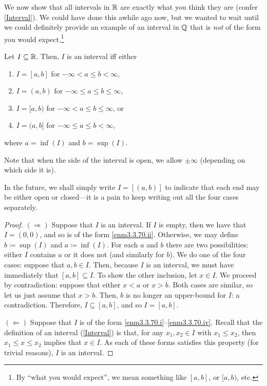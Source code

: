 We now show that all intervals in $\mathbb{R}$ are exactly what you think they are (confer \cref{Interval}).  We could have done this awhile ago now, but we wanted to wait until we could definitely provide an example of an interval in $\mathbb{Q}$ that is \emph{not} of the form you would expect.\footnote{By ``what you would expect'', we mean something like $[a,b]$, or $[a,b)$, etc.}
\begin{prp}\label{prp3.3.70}
Let $I\subseteq \mathbb{R}$.  Then, $I$ is an interval iff either
\begin{enumerate}
\item \label{enm3.3.70.i}$I=[a,b]$ for $-\infty <a\leq b<\infty $,
\item \label{enm3.3.70.ii}$I=(a,b)$ for $-\infty \leq a\leq b\leq \infty$,
\item \label{enm3.3.70.iii}$I=[a,b)$ for $-\infty <a\leq b\leq \infty$, or
\item \label{enm3.3.70.iv}$I=(a,b]$ for $-\infty \leq a\leq b<\infty$,
\end{enumerate}
where $a=\inf (I)$ and $b=\sup (I)$.
\begin{rmk}
Note that when the side of the interval is open, we allow $\pm \infty$ (depending on which side it is).
\end{rmk}
\begin{rmk}
In the future, we shall simply write $I=[(a,b)]$\index[notation]{$[(a,b)]$} to indicate that each end may be either open or closed---it is a pain to keep writing out all the four cases separately.
\end{rmk}
\begin{proof}
$(\Rightarrow )$ Suppose that $I$ is an interval.  If $I$ is empty, then we have that $I=(0,0)$, and so is of the form \ref{enm3.3.70.ii}.  Otherwise, we may define $b\coloneqq \sup (I)$ and $a\coloneqq \inf (I)$.  For each $a$ and $b$ there are two possibilities: either $I$ contains $a$ or it does not (and similarly for $b$).  We do one of the four cases:  suppose that $a,b\in I$.  Then, because $I$ is an interval, we must have immediately that $[a,b]\subseteq I$.  To show the other inclusion, let $x\in I$.  We proceed by contradiction:  suppose that either $x<a$ or $x>b$.  Both cases are similar, so let us just assume that $x>b$.  Then, $b$ is no longer an upper-bound for $I$:  a contradiction.  Therefore, $I\subseteq [a,b]$, and so $I=[a,b]$.

\blankline
\noindent
$(\Leftarrow )$ Suppose that $I$ is of the form \ref{enm3.3.70.i}--\ref{enm3.3.70.iv}.  Recall that the definition of an interval (\cref{Interval}) is that, for any $x_1,x_2\in I$ with $x_1\leq x_2$, then $x_1\leq x\leq x_2$ implies that $x\in I$.  As each of these forms satisfies this property (for trivial reasons), $I$ is an interval.
\end{proof}
\end{prp}
